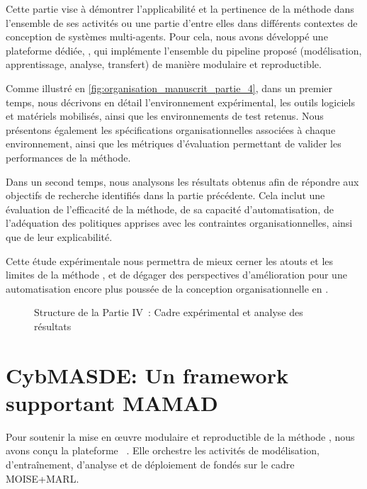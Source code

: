 \noindent
Cette partie vise à démontrer l'applicabilité et la pertinence de la méthode  dans l'ensemble de ses activités ou une partie d'entre elles dans différents contextes de conception de systèmes multi-agents. Pour cela, nous avons développé une plateforme dédiée, , qui implémente l'ensemble du pipeline proposé (modélisation, apprentissage, analyse, transfert) de manière modulaire et reproductible.

\medskip

\noindent
Comme illustré en \autoref{fig:organisation_manuscrit_partie_4}, dans un premier temps, nous décrivons en détail l'environnement expérimental, les outils logiciels et matériels mobilisés, ainsi que les environnements de test retenus. Nous présentons également les spécifications organisationnelles associées à chaque environnement, ainsi que les métriques d'évaluation permettant de valider les performances de la méthode.

\medskip

\noindent
Dans un second temps, nous analysons les résultats obtenus afin de répondre aux objectifs de recherche identifiés dans la partie précédente. Cela inclut une évaluation de l'efficacité de la méthode, de sa capacité d'automatisation, de l'adéquation des politiques apprises avec les contraintes organisationnelles, ainsi que de leur explicabilité.

\medskip

\noindent
Cette étude expérimentale nous permettra de mieux cerner les atouts et les limites de la méthode , et de dégager des perspectives d'amélioration pour une automatisation encore plus poussée de la conception organisationnelle en .



\begin{figure}[h!]
  \centering
  \resizebox{0.8\linewidth}{!}{%
    
  }
  \caption{Structure de la Partie IV~: Cadre expérimental et analyse des résultats}
  \label{fig:organisation_manuscrit_partie_4}
\end{figure}

\clearpage
\thispagestyle{empty}
\null
\newpage

\chapter{CybMASDE: Un framework supportant MAMAD}
\label{sec:cybmasde}

Pour soutenir la mise en œuvre modulaire et reproductible de la méthode , nous avons conçu la plateforme ~\footnotemark[2]. Elle orchestre les activités de modélisation, d'entraînement, d'analyse et de déploiement de  fondés sur le cadre MOISE+MARL.

